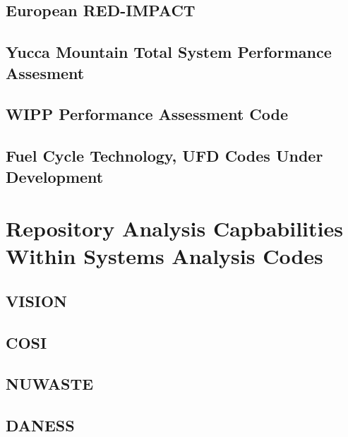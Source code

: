 \subsection{European RED-IMPACT}

\subsection{Yucca Mountain Total System Performance Assesment}

\subsection{WIPP Performance Assessment Code}

\subsection{Fuel Cycle Technology, UFD Codes Under Development}


\section{Repository Analysis Capbabilities Within Systems Analysis 
Codes}\label{sec:SA_repos}

\subsection{VISION}

\subsection{COSI}

\subsection{NUWASTE}

\subsection{DANESS}

